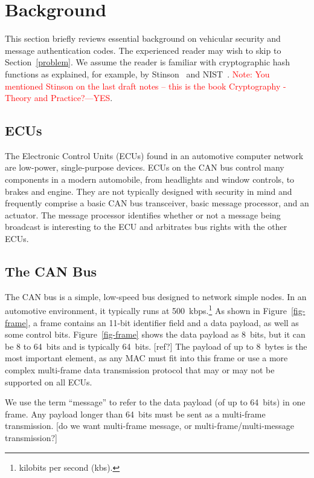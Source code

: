 \section{Background}
\label{background}

This section briefly reviews essential background on vehicular security and message authentication codes. 
The experienced reader may wish to skip to Section~\ref{problem}. 
We assume the reader is familiar with cryptographic hash functions as explained, for example, by Stinson~\cite{Sti} and NIST~\cite{FIPS-180-4}.
\textcolor{red}{Note: You mentioned Stinson on the last draft notes -- this is the book Cryptography - Theory and Practice?---YES}.

\subsection{ECUs}
The Electronic Control Units (ECUs) found in an automotive computer network are low-power, single-purpose devices. ECUs on the CAN bus control many components in a modern automobile, from headlights and window controls, to brakes and engine. They are not typically designed with security in mind and frequently comprise a basic CAN bus transceiver, basic message processor, and an actuator. The message processor identifies whether or not a message being broadcast is interesting to the ECU and arbitrates bus rights with the other ECUs. 

\subsection{The CAN Bus}
The CAN bus is a simple, low-speed bus designed to network simple nodes. In an automotive environment, 
it typically runs at 500~kbps.\footnote{kilobits per second (kbs).} As shown in Figure~\ref{fig-frame}, 
a frame contains an 11-bit identifier field and 
a data payload, as well as some control bits. Figure~\ref{fig-frame} shows the data payload as 8~bits, but
it can be 8 to 64~bits and is typically 64~bits. [ref?]
The payload of up to 8~bytes is the most important element, as any MAC must fit into this frame or use a more complex multi-frame data transmission protocol that may or may not be supported on all ECUs. 

We use the term ``message'' to refer to the data payload (of up to 64~bits) in one frame.
Any payload longer than 64~bits must be sent as a multi-frame transmission.
[do we want multi-frame message, or multi-frame/multi-message transmission?]

